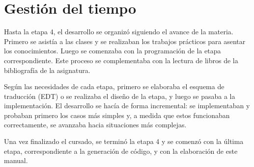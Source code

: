 \chapter{Gestión del tiempo}
\label{cap:gestion-tiempo}

Hasta la etapa 4, el desarrollo se organizó siguiendo el avance de la
materia. Primero se asistía a las clases y se realizaban los trabajos
prácticos para asentar los conocimientos. Luego se comenzaba con la
programación de la etapa correspondiente. Este proceso se complementaba
con la lectura de libros de la bibliografía de la asignatura.

Según las necesidades de cada etapa, primero se elaboraba el esquema de
traducción (EDT) o se realizaba el diseño de la etapa, y luego se pasaba
a la implementación. El desarrollo se hacía de forma incremental: se
implementaban y probaban primero los casos más simples y, a medida que
estos funcionaban correctamente, se avanzaba hacia situaciones más
complejas.

Una vez finalizado el cursado, se terminó la etapa 4 y se comenzó con la
última etapa, correspondiente a la generación de código, y con la
elaboración de este manual.
